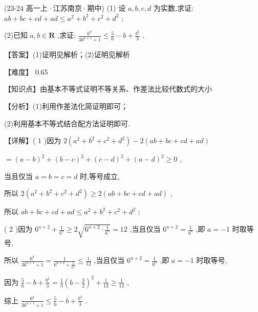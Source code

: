 \documentclass[11pt,a4paper]{article}
\begin{document}
\begin{hmwk} 
 (23-24 高一上·江苏南京·期中) (1) 设 \(\displaystyle a,b,c,d\) 为实数,求证: \(\displaystyle {ab} + {bc} + {cd} + {ad} \leq  {a}^{2} + {b}^{2} + {c}^{2} + {d}^{2}\) ;

(2)已知 \(\displaystyle a,b \in  \mathbf{R}\) ,求证: \(\displaystyle \frac{{6}^{a}}{{36}^{a + 1} + 1} \leq  \frac{5}{6} - b + \frac{{b}^{2}}{3}\) .

\begin{jiexi}[45]
【答案】(1)证明见解析；(2)证明见解析

【难度】 0.65

【知识点】由基本不等式证明不等关系、作差法比较代数式的大小

【分析】(1)利用作差法化简证明即可；

(2)利用基本不等式结合配方法证明即可.

【详解】( 1 )因为 \(\displaystyle 2\left( {{a}^{2} + {b}^{2} + {c}^{2} + {d}^{2}}\right)  - 2\left( {{ab} + {bc} + {cd} + {ad}}\right)\)

\(\displaystyle = {\left( a - b\right) }^{2} + {\left( b - c\right) }^{2} + {\left( c - d\right) }^{2} + {\left( a - d\right) }^{2} \geq  0\) ,

当且仅当 \(\displaystyle a = b = c = d\) 时,等号成立,

所以 \(\displaystyle 2\left( {{a}^{2} + {b}^{2} + {c}^{2} + {d}^{2}}\right)  \geq  2\left( {{ab} + {bc} + {cd} + {ad}}\right)\) ,

所以 \(\displaystyle {ab} + {bc} + {cd} + {ad} \leq  {a}^{2} + {b}^{2} + {c}^{2} + {d}^{2}\) ;

( 2 )因为 \(\displaystyle {6}^{a + 2} + \frac{1}{{6}^{a}} \geq  2\sqrt{{6}^{a + 2} \cdot  \frac{1}{{6}^{a}}} = {12}\) ,当且仅当 \(\displaystyle {6}^{a + 2} = \frac{1}{{6}^{a}}\) ,即 \(\displaystyle a =  - 1\) 时取等号,

所以 \(\displaystyle \frac{{6}^{a}}{{36}^{a + 1} + 1} = \frac{1}{{6}^{a + 2} + \frac{1}{{6}^{a}}} \leq  \frac{1}{12}\) ,当且仅当 \(\displaystyle {6}^{a + 2} = \frac{1}{{6}^{a}}\) ,即 \(\displaystyle a =  - 1\) 时取等号,

因为 \(\displaystyle \frac{5}{6} - b + \frac{{b}^{2}}{3} = \frac{1}{3}{\left( b - \frac{3}{2}\right) }^{2} + \frac{1}{12} \geq  \frac{1}{12}\) ,

综上 \(\displaystyle \frac{{6}^{a}}{{36}^{a + 1} + 1} \leq  \frac{5}{6} - b + \frac{{b}^{2}}{3}\) .

\end{jiexi}
\end{hmwk}
\end{document}

